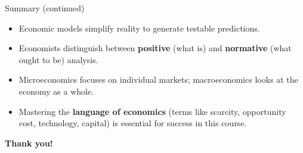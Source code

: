 \documentclass[aspectratio=169]{beamer}
\begin{document}
\begin{frame}{Summary (continued)}
\transfade
\begin{itemize}
  \item Economic models simplify reality to generate testable predictions.
  \item Economists distinguish between \textbf{positive} (what is) and \textbf{normative} (what ought to be) analysis.
  \item Microeconomics focuses on individual markets; macroeconomics looks at the economy as a whole.
  \item Mastering the \textbf{language of economics} (terms like scarcity, opportunity cost, technology, capital) is essential for success in this course.
\end{itemize}
\end{frame}

\begin{frame}
\centering
\Huge \textbf{Thank you!}
\end{frame}
\end{document}
